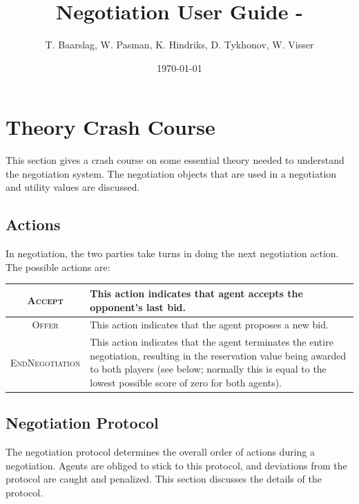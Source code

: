 \documentclass[]{article}
\title{Negotiation User Guide - \ANAC{ANAC Version}\AI{AI Techniques (IN4010TU) Version}}
\author{T. Baarslag, W. Pasman, K. Hindriks, D. Tykhonov, W. Visser}
\date{\today}
\newcommand\AI[1]{{}} \newcommand\ANAC[1]{{#1}}
\begin{document}
\ifpdf
{}
\else
{}
\fi

\maketitle

\newcommand\Genius{{\sc Genius}}


\pagebreak
\tableofcontents

\pagebreak
\section{Theory Crash Course}
This section gives a crash course on some essential theory needed to understand the negotiation system. The negotiation objects that are used in a negotiation and utility values are discussed. 

\subsection{Actions}
In negotiation, the two parties take turns in doing the next negotiation action. The possible actions are:

\begin{center}
\begin{tabular}{cm{}}
\hline
\textsc{Accept} & This action indicates that agent accepts the opponent's last bid.\\
\hline
\textsc{Offer} & This action indicates that the agent proposes a new bid.\\
\hline
\textsc{EndNegotiation} & This action indicates that the agent terminates the entire negotiation, resulting in the reservation value being awarded to both players (see below; normally this is equal to the lowest possible score of zero for both agents).\\
\hline
\end{tabular}
\end{center}

\subsection{Negotiation Protocol}
The negotiation protocol determines the overall order of actions during a negotiation. Agents are obliged to stick to this protocol, and deviations from the protocol are caught and penalized. This section discusses the details of the protocol\AI{ for this assignment}.
\end{document}
